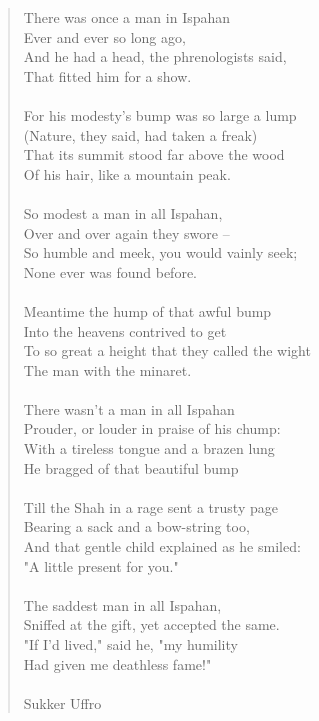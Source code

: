 \documentclass[11pt]{article}
\begin{document}
\begin{quote}   There was once a man in Ispahan \\
      Ever and ever so long ago, \\
  And he had a head, the phrenologists said, \\
      That fitted him for a show. \\
 \\
  For his modesty's bump was so large a lump \\
      (Nature, they said, had taken a freak) \\
  That its summit stood far above the wood \\
      Of his hair, like a mountain peak. \\
 \\
  So modest a man in all Ispahan, \\
      Over and over again they swore -- \\
  So humble and meek, you would vainly seek; \\
      None ever was found before. \\
 \\
  Meantime the hump of that awful bump \\
      Into the heavens contrived to get \\
  To so great a height that they called the wight \\
      The man with the minaret. \\
 \\
  There wasn't a man in all Ispahan \\
      Prouder, or louder in praise of his chump: \\
  With a tireless tongue and a brazen lung \\
      He bragged of that beautiful bump \\
 \\
  Till the Shah in a rage sent a trusty page \\
      Bearing a sack and a bow-string too, \\
  And that gentle child explained as he smiled: \\
      "A little present for you." \\
 \\
  The saddest man in all Ispahan, \\
      Sniffed at the gift, yet accepted the same. \\
  "If I'd lived," said he, "my humility \\
      Had given me deathless fame!" \\
 \\
Sukker Uffro \end{quote}
\end{document}
